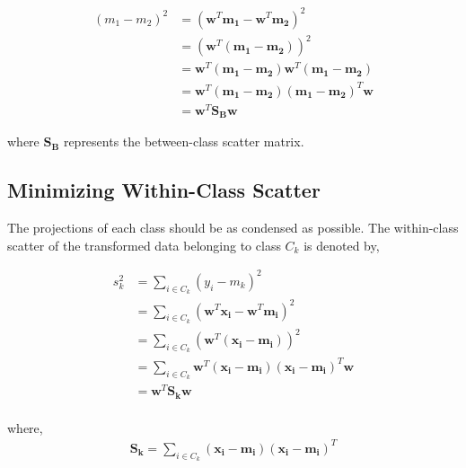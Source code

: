 \documentclass[11pt, a4paper]{article}
\begin{document}
\begin{align*}
	(m_1 - m_2)^2 & = (\boldsymbol{w}^T\boldsymbol{m_1} - \boldsymbol{w}^T\boldsymbol{m_2})^2                                    \\
	              & = (\boldsymbol{w}^T(\boldsymbol{m_1} - \boldsymbol{m_2}))^2                                                  \\
	              & = \boldsymbol{w}^T(\boldsymbol{m_1} - \boldsymbol{m_2})\boldsymbol{w}^T(\boldsymbol{m_1} - \boldsymbol{m_2}) \\
	              & = \boldsymbol{w}^T(\boldsymbol{m_1} - \boldsymbol{m_2})(\boldsymbol{m_1} - \boldsymbol{m_2})^T\boldsymbol{w} \\
	              & = \boldsymbol{w}^T\boldsymbol{S_B}\boldsymbol{w}                                                             
\end{align*} 

where $\boldsymbol{S_B}$ represents the between-class scatter matrix.

\subsection{Minimizing Within-Class Scatter}

The projections of each class should be as condensed as possible. The within-class scatter of the transformed data belonging to class $C_k$ is denoted by,

\begin{align*}
	s_k^2 & = \sum_{i \in C_k} (y_i - m_k)^2                                                                                            \\
	      & = \sum_{i \in C_k} (\boldsymbol{w}^T\boldsymbol{x_i} - \boldsymbol{w}^T\boldsymbol{m_i})^2                                  \\
	      & = \sum_{i \in C_k} (\boldsymbol{w}^T(\boldsymbol{x_i} -\boldsymbol{m_i}))^2                                                 \\
	      & = \sum_{i \in C_k} \boldsymbol{w}^T(\boldsymbol{x_i} -\boldsymbol{m_i})(\boldsymbol{x_i} -\boldsymbol{m_i})^T\boldsymbol{w} \\
	      & = \boldsymbol{w}^T \boldsymbol{S_k} \boldsymbol{w}                                                                          \\
\end{align*}  

where,
\begin{align*}
	\boldsymbol{S_k} = \sum_{i \in C_k}(\boldsymbol{x_i} -\boldsymbol{m_i})(\boldsymbol{x_i} -\boldsymbol{m_i})^T 
\end{align*}
\end{document}
